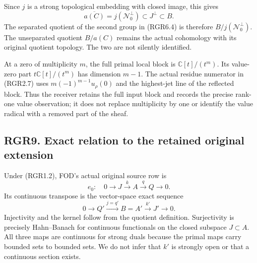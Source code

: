 Since \(j\) is a strong topological embedding with closed image, this
gives \[
 \overline{a(C)}=j(\mathcal N_0^\perp)\subset J^\perp\subset B.
 \tag{RGR8.2}
\] The separated quotient of the second group in (RGR6.4) is therefore
\(B/j(\mathcal N_0^\perp)\). The unseparated quotient \(B/a(C)\) remains
the actual cohomology with its original quotient topology. The two are
not silently identified.

At a zero of multiplicity \(m\), the full primal local block is
\(\mathbb C[t]/(t^m)\). Its value-zero part \(t\mathbb C[t]/(t^m)\) has
dimension \(m-1\). The actual residue numerator in (RGR2.7) uses
\(m(-1)^{m-1}u_\rho(0)\) and the highest-jet line of the reflected
block. Thus the receiver retains the full input block and records the
precise rank-one value observation; it does not replace multiplicity by
one or identify the value radical with a removed part of the sheaf.

\subsection{RGR9. Exact relation to the retained original
extension}\label{rgr9.-exact-relation-to-the-retained-original-extension}

Under (RGR1.2), FOD's actual original source row is \[
 e_0:\quad0\longrightarrow J\xrightarrow{k}A\xrightarrow q Q\longrightarrow0.
 \tag{RGR9.1}
\] Its continuous transpose is the vector-space exact sequence \[
 0\longrightarrow Q'\xrightarrow{j=q'}B=A'
   \xrightarrow{k'}J'\longrightarrow0.
 \tag{RGR9.2}
\] Injectivity and the kernel follow from the quotient definition.
Surjectivity is precisely Hahn--Banach for continuous functionals on the
closed subspace \(J\subset A\). All three maps are continuous for strong
duals because the primal maps carry bounded sets to bounded sets. We do
not infer that \(k'\) is strongly open or that a continuous section
exists.

